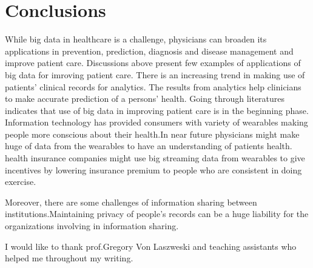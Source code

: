 \documentclass[sigconf]{acmart}
\begin{document}
\section{Conclusions}
While big data in healthcare is a challenge, physicians can broaden its applications in prevention, prediction, diagnosis and disease management and improve  patient care. Discussions above present few examples of applications of big data for imroving patient care. 
There is an increasing trend in making use of patients' clinical records for  analytics. The results from analytics help clinicians to make accurate prediction of a persons' health.   
Going through literatures indicates that use of big data in improving patient care is in the beginning phase. Information technology has provided consumers with variety of wearables making people more conscious about their health.In near future physicians might make huge of data from the wearables to have an understanding of patients health. health insurance companies might use big streaming data from wearables to give incentives by lowering insurance premium to people who are consistent in doing exercise.

Moreover, there are some challenges of information sharing between
institutions.Maintaining privacy of people's records can be a huge liability for the organizations involving in information sharing.








\appendix



\begin{acks}

I would like to thank prof.Gregory Von Laszweski and teaching assistants who helped me throughout my writing. 
\end{acks}


 
\end{document}
